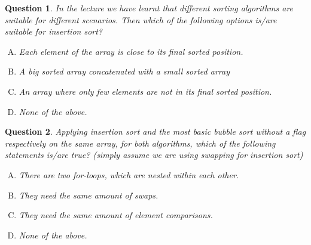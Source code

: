 \documentclass[10.5pt]{article}
\newtheorem{Q}{Question}
\begin{document}
    \begin{Q}
		In the lecture we have learnt that different sorting algorithms are suitable for different scenarios. Then which of the following options is/are suitable for insertion sort?
		\begin{enumerate}[(A)]
			\item Each element of the array is close to its final sorted position.
			\item A big sorted array concatenated with a small sorted array 
			\item An array where only few elements are not in its final sorted position.
			\item None of the above.
		\end{enumerate}
	\end{Q}
	
	\begin{Q}
		Applying insertion sort and the most basic bubble sort without a flag respectively on the same array, for both algorithms, which of the following statements is/are true? (simply assume we are using swapping for insertion sort)
		\begin{enumerate}[(A)]
			\item There are two for-loops, which are nested within each other.
			\item They need the same amount of swaps.
			\item They need the same amount of element comparisons.
			\item None of the above.
		\end{enumerate}
	\end{Q}
	
\end{document}
